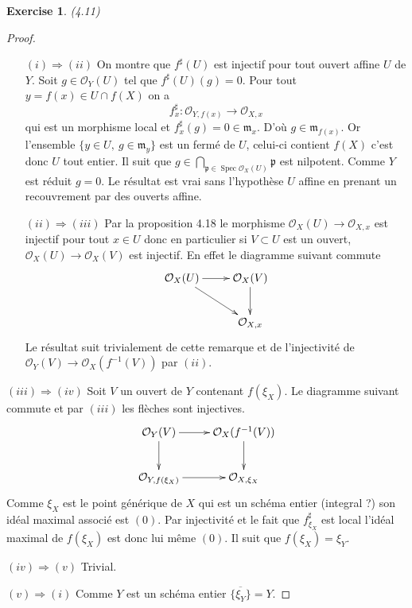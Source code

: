 \documentclass[A4, 11pt]{article}
\newtheorem{exer}{Exercise}
\def\Spec{ \operatorname{Spec}}
\begin{document}
\begin{exer}(4.11)

\end{exer}
\begin{proof}
\begin{itemize}

\item[$(i)\Rightarrow (ii)$] On montre que $f^{\sharp}(U)$ est injectif pour tout ouvert affine $U$ de $Y$. Soit $g\in \mathcal{O}_Y(U)$ tel que $f^{\sharp}(U)(g)=0$. Pour tout $y=f(x)\in U\cap f(X)$ on a 
$$f^{\sharp}_x\colon \mathcal{O}_{Y,f(x)} \rightarrow \mathcal{O}_{X,x}$$
qui est un morphisme local et $f^{\sharp}_x(g)=0\in \mathfrak{m}_x$. D'où $g\in \mathfrak{m}_{f(x)}$. Or l'ensemble $\{y\in U, ~g\in \mathfrak{m}_y\}$ est un fermé de $U$, celui-ci contient $f(X)$ c'est donc $U$ tout entier. Il suit que $g\in \bigcap\limits_{\mathfrak{p}\in \Spec \mathcal{O}_X(U)} \mathfrak{p}$ est nilpotent. Comme $Y$ est réduit $g=0$. Le résultat est vrai sans l'hypothèse $U$ affine en prenant un recouvrement par des ouverts affine.
\item[$(ii)\Rightarrow (iii)$] Par la proposition 4.18 le morphisme $\mathcal{O}_X(U)\rightarrow \mathcal{O}_{X,x}$ est injectif pour tout $x\in U$ donc en particulier si $V\subset U$ est un ouvert, $\mathcal{O}_X(U)\rightarrow \mathcal{O}_X(V)$ est injectif. En effet le diagramme suivant commute
$$\xymatrix{
\mathcal{O}_X(U) \ar[r] \ar[dr] & \mathcal{O}_X(V) \ar[d] \\
 & \mathcal{O}_{X,x} 
}$$ 
Le résultat suit trivialement de cette remarque et de l'injectivité de $\mathcal{O}_Y(V) \rightarrow \mathcal{O}_X(f^{-1}(V))$ par $(ii)$.
\end{itemize}

\item[$(iii)\Rightarrow (iv)$] Soit $V$ un ouvert de $Y$ contenant $f(\xi_X )$. Le diagramme suivant commute et par $(iii)$ les flèches sont injectives.
$$\xymatrix{
\mathcal{O}_Y(V) \ar[r] \ar[d] & \mathcal{O}_X(f^{-1}(V)) \ar[d]\\
\mathcal{O}_{Y,f(\xi_X)} \ar[r] & \mathcal{O}_{X,\xi_X} 
}$$
Comme $\xi_X$ est le point générique de $X$ qui est un schéma entier (integral ?) son idéal maximal associé est $(0)$. Par injectivité et le fait que $f^{\sharp}_{\xi_X}$ est local l'idéal maximal de $f(\xi_X)$ est donc lui même $(0)$. Il suit que $f(\xi_X)=\xi_Y$.

\item[$(iv)\Rightarrow (v)$] Trivial.
\item[$(v)\Rightarrow (i)$] Comme $Y$ est un schéma entier $\overline{\{\xi_Y\}}=Y$.
 
\end{proof}
\end{document}
